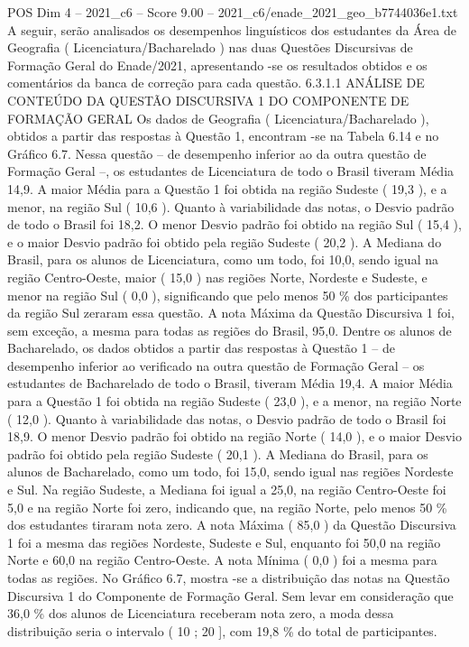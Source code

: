 \begin{textsample}{POS Dim 4 – 2021\_c6 – Score 9.00 – 2021\_c6/enade\_2021\_geo\_b7744036e1.txt}
A seguir, serão analisados os desempenhos linguísticos dos estudantes da Área de Geografia ( Licenciatura/Bacharelado ) nas duas Questões Discursivas de Formação Geral do Enade/2021, apresentando -se os resultados obtidos e os comentários da banca de correção para cada questão. 6.3.1.1 ANÁLISE DE CONTEÚDO DA QUESTÃO DISCURSIVA 1 DO COMPONENTE DE FORMAÇÃO GERAL Os dados de Geografia ( Licenciatura/Bacharelado ), obtidos a partir das respostas à Questão 1, encontram -se na Tabela 6.14 e no Gráfico 6.7.
Nessa questão – de desempenho inferior ao da outra questão de Formação Geral –, os estudantes de Licenciatura de todo o Brasil tiveram Média 14,9.
A maior Média para a Questão 1 foi obtida na região Sudeste ( 19,3 ), e a menor, na região Sul ( 10,6 ).
Quanto à variabilidade das notas, o Desvio padrão de todo o Brasil foi 18,2.
O menor Desvio padrão foi obtido na região Sul ( 15,4 ), e o maior Desvio padrão foi obtido pela região Sudeste ( 20,2 ).
A Mediana do Brasil, para os alunos de Licenciatura, como um todo, foi 10,0, sendo igual na região Centro-Oeste, maior ( 15,0 ) nas regiões Norte, Nordeste e Sudeste, e menor na região Sul ( 0,0 ), significando que pelo menos 50 \% dos participantes da região Sul zeraram essa questão.
A nota Máxima da Questão Discursiva 1 foi, sem exceção, a mesma para todas as regiões do Brasil, 95,0.
Dentre os alunos de Bacharelado, os dados obtidos a partir das respostas à Questão 1 – de desempenho inferior ao verificado na outra questão de Formação Geral – os estudantes de Bacharelado de todo o Brasil, tiveram Média 19,4.
A maior Média para a Questão 1 foi obtida na região Sudeste ( 23,0 ), e a menor, na região Norte ( 12,0 ).
Quanto à variabilidade das notas, o Desvio padrão de todo o Brasil foi 18,9.
O menor Desvio padrão foi obtido na região Norte ( 14,0 ), e o maior Desvio padrão foi obtido pela região Sudeste ( 20,1 ).
A Mediana do Brasil, para os alunos de Bacharelado, como um todo, foi 15,0, sendo igual nas regiões Nordeste e Sul.
Na região Sudeste, a Mediana foi igual a 25,0, na região Centro-Oeste foi 5,0 e na região Norte foi zero, indicando que, na região Norte, pelo menos 50 \% dos estudantes tiraram nota zero.
A nota Máxima ( 85,0 ) da Questão Discursiva 1 foi a mesma das regiões Nordeste, Sudeste e Sul, enquanto foi 50,0 na região Norte e 60,0 na região Centro-Oeste.
A nota Mínima ( 0,0 ) foi a mesma para todas as regiões.
No Gráfico 6.7, mostra -se a distribuição das notas na Questão Discursiva 1 do Componente de Formação Geral.
Sem levar em consideração que 36,0 \% dos alunos de Licenciatura receberam nota zero, a moda dessa distribuição seria o intervalo ( 10 ; 20 ], com 19,8 \% do total de participantes.

\end{textsample}
